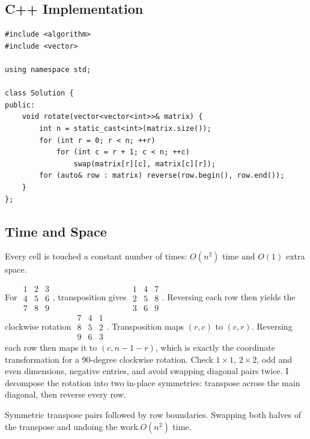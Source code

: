 \subsection{C++ Implementation}
\begin{lstlisting}[style=compactcode,caption={Complete C++ solution: Rotate Image}]
#include <algorithm>
#include <vector>

using namespace std;

class Solution {
public:
    void rotate(vector<vector<int>>& matrix) {
        int n = static_cast<int>(matrix.size());
        for (int r = 0; r < n; ++r)
            for (int c = r + 1; c < n; ++c)
                swap(matrix[r][c], matrix[c][r]);
        for (auto& row : matrix) reverse(row.begin(), row.end());
    }
};
\end{lstlisting}

\subsection{Time and Space}
Every cell is touched a constant number of times: \(O(n^2)\) time and
\(O(1)\) extra space.

\lessonexpansion
  {For \(\begin{smallmatrix}1&2&3\\4&5&6\\7&8&9\end{smallmatrix}\),
   transposition gives
   \(\begin{smallmatrix}1&4&7\\2&5&8\\3&6&9\end{smallmatrix}\).
   Reversing each row then yields the clockwise rotation
   \(\begin{smallmatrix}7&4&1\\8&5&2\\9&6&3\end{smallmatrix}\).}
  {Transposition maps \((r,c)\) to \((c,r)\). Reversing each row then maps it
   to \((c,n-1-r)\), which is exactly the coordinate transformation for a
   90-degree clockwise rotation.}
  {Check \(1\times1\), \(2\times2\), odd and even dimensions, negative
   entries, and avoid swapping diagonal pairs twice.}
  {I decompose the rotation into two in-place symmetries: transpose across the
   main diagonal, then reverse every row.}

  {Symmetric transpose pairs followed by row boundaries.}
  {Swapping both halves of the transpose and undoing the work.}{$O(n^2)$ time.}


